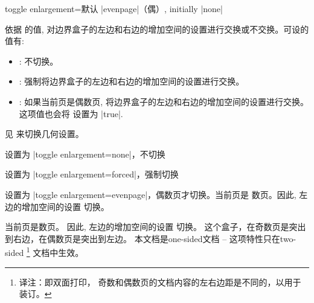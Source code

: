 \begin{docTcbKey}[][doc updated=2015-11-13]{toggle enlargement}{=}{默认 |evenpage|（偶）, initially |none|}

依据  的值, 对边界盒子的左边和右边的增加空间的设置进行交换或不交换。可设的值有:
  \begin{itemize}
  \item{}: %
  不切换。
  \item{}: %
  强制将边界盒子的左边和右边的增加空间的设置进行交换。
  \item{}: 
如果当前页是偶数页, 将边界盒子的左边和右边的增加空间的设置进行交换。这项值也会将   设置为 |true|.
  \end{itemize}
\begin{marker}
见  来切换几何设置。
\end{marker}

\begin{dispExample}

\begin{tcolorbox}[toggle enlargement=none
  ,enhanced,show bounding box]
设置为 |toggle enlargement=none|，不切换
\end{tcolorbox}
\begin{tcolorbox}[toggle enlargement=forced]
  设置为 |toggle enlargement=forced|，强制切换
\end{tcolorbox}
\begin{tcolorbox}[toggle enlargement=evenpage]
设置为 |toggle enlargement=evenpage|，偶数页才切换。当前页是  数页。因此, 左边的增加空间的设置 切换。
\end{tcolorbox}
\end{dispExample}

\begin{dispListing}
\begin{tcolorbox}[colframe=red!60!black,colback=red!15!white,
  fonttitle=\bfseries,title=Floating box from \texttt{toggle enlargement},
  width=\textwidth
,grow to right by=2cm%
,toggle enlargement%
,float=t]
当前页是数页。%
因此, 左边的增加空间的设置 切换。%
这个盒子，在奇数页是突出到右边，在偶数页是突出到左边。%
本文档是one-sided文档 -- 这项特性只在two-sided%
\footnote{译注：即双面打印，%
奇数和偶数页的文档内容的左右边距是不同的，以用于装订。}%
文档中生效。
\end{tcolorbox}
\end{dispListing}
\tcbusetemp
\end{docTcbKey}
